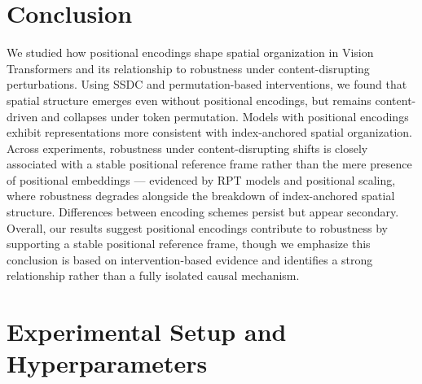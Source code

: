 \documentclass{article}
\begin{document}
\section{Conclusion}

We studied how positional encodings shape spatial organization in Vision Transformers and its relationship to robustness under content-disrupting perturbations. Using SSDC and permutation-based interventions, we found that spatial structure emerges even without positional encodings, but remains content-driven and collapses under token permutation. Models with positional encodings exhibit representations more consistent with index-anchored spatial organization. Across experiments, robustness under content-disrupting shifts is closely associated with a stable positional reference frame rather than the mere presence of positional embeddings — evidenced by RPT models and positional scaling, where robustness degrades alongside the breakdown of index-anchored spatial structure. Differences between encoding schemes persist but appear secondary. Overall, our results suggest positional encodings contribute to robustness by supporting a stable positional reference frame, though we emphasize this conclusion is based on intervention-based evidence and identifies a strong relationship rather than a fully isolated causal mechanism.





\newpage
\appendix

\section{Experimental Setup and Hyperparameters}
\end{document}
